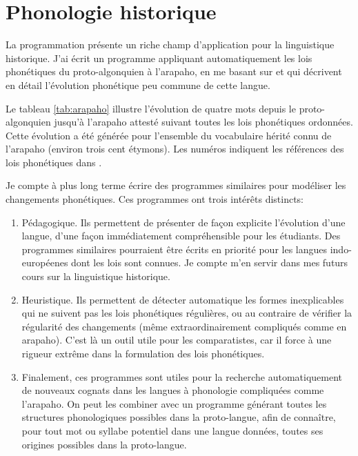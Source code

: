\documentclass[oldfontcommands,oneside,a4paper,11pt]{memoir}
\begin{document}
\section{Phonologie historique} \label{sec:comp.ling.hist}
La programmation présente un riche champ d'application pour la linguistique historique. J'ai écrit un programme appliquant automatiquement les lois phonétiques du proto-algonquien à l'arapaho, en me basant   sur \citet{goddard74arapaho} et  \citet{goddard98arapaho}  qui décrivent en détail l'évolution phonétique peu commune de cette langue. 

Le tableau \ref{tab:arapaho} illustre l'évolution de quatre mots depuis le proto-algonquien jusqu'à l'arapaho attesté suivant toutes les lois phonétiques ordonnées. Cette évolution a été générée pour l'ensemble du vocabulaire hérité connu de l'arapaho (environ trois cent étymons). Les numéros indiquent les références des lois phonétiques dans \citet{goddard74arapaho}.

Je compte à plus long terme écrire des programmes similaires pour modéliser les changements phonétiques. Ces programmes ont trois intérêts distincts:

\begin{enumerate} 
\item Pédagogique. Ils permettent de présenter de façon explicite l'évolution d'une langue, d'une façon immédiatement compréhensible pour les étudiants. Des programmes similaires pourraient être écrits en priorité pour les langues indo-européenes dont les lois sont connues. Je compte m'en servir dans mes futurs cours sur la linguistique historique.
 
\item Heuristique. Ils permettent de détecter automatique les formes inexplicables qui ne suivent pas les lois phonétiques régulières, ou au contraire de vérifier la régularité des changements (même extraordinairement compliqués comme en arapaho). C'est là un outil utile pour les comparatistes, car il force à une rigueur extrême dans la formulation des lois phonétiques.
 
\item Finalement, ces programmes sont utiles pour la recherche automatiquement de nouveaux cognats dans les langues à phonologie compliquées comme l'arapaho. On peut les combiner avec un programme générant toutes les structures phonologiques possibles dans la proto-langue, afin de connaître, pour tout mot ou syllabe potentiel dans une langue données, toutes ses origines possibles dans la proto-langue.
\end{enumerate}
\end{document}
